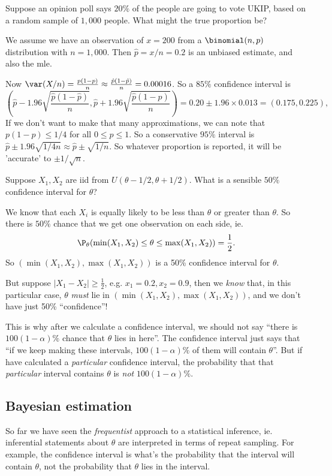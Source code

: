 \documentclass[a4paper]{article}
\begin{document}
\begin{eg}
  Suppose an opinion poll says $20\%$ of the people are going to vote UKIP, based on a random sample of $1,000$ people. What might the true proportion be?

  We assume we have an observation of $x = 200$ from a $\binomial(n, p)$ distribution with $n = 1,000$. Then $\hat p = x/n = 0.2$ is an unbiased estimate, and also the mle.

  Now $\var(X/n) = \frac{p(1 - p)}{n}\approx \frac{\hat p(1 - \hat p)}{n} = 0.00016$. So a $85\%$ confidence interval is
  \[
    \left(\hat p - 1.96\sqrt{\frac{\hat p(1 - \hat p)}{n}}, \hat p + 1.96\sqrt{\frac{\hat p(1 - \hat p)}{n}}\right) = 0.20 \pm 1.96\times 0.013 = (0.175, 0.225),
  \]
  If we don't want to make that many approximations, we can note that $p(1 - p)\leq 1/4$ for all $0 \leq p \leq 1$. So a conservative $95\%$ interval is $\hat p \pm 1.96\sqrt{1/4n} \approx \hat p \pm \sqrt{1/n}$. So whatever proportion is reported, it will be 'accurate' to $\pm 1/\sqrt{n}$.
\end{eg}

\begin{eg}
  Suppose $X_1, X_2$ are iid from $U(\theta - 1/2, \theta + 1/2)$. What is a sensible $50\%$ confidence interval for $\theta$?

  We know that each $X_i$ is equally likely to be less than $\theta$ or greater than $\theta$. So there is $50\%$ chance that we get one observation on each side, ie.
  \[
    \P_\theta(\min(X_1, X_2) \leq \theta \leq \max(X_1, X_2)) = \frac{1}{2}.
  \]
  So $(\min(X_1, X_2), \max (X_1, X_2))$ is a 50\% confidence interval for $\theta$.

  But suppose $|X_1 - X_2| \geq \frac{1}{2}$, e.g. $x_1 = 0.2, x_2 = 0.9$, then we \emph{know} that, in this particular case, $\theta$ \emph{must} lie in $(\min (X_1, X_2), \max(X_1, X_2))$, and we don't have just 50\% ``confidence''!

  This is why after we calculate a confidence interval, we should not say ``there is $100(1 - \alpha)\%$ chance that $\theta$ lies in here''. The confidence interval just says that ``if we keep making these intervals, $100(1 - \alpha)\%$ of them will contain $\theta$''. But if have calculated a \emph{particular} confidence interval, the probability that that \emph{particular} interval contains $\theta$ is \emph{not} $100(1 - \alpha)\%$.
\end{eg}

\subsection{Bayesian estimation}
So far we have seen the \emph{frequentist} approach to a statistical inference, ie. inferential statements about $\theta$ are interpreted in terms of repeat sampling. For example, the confidence interval is what's the probability that the interval will contain $\theta$, not the probability that $\theta$ lies in the interval.
\end{document}

